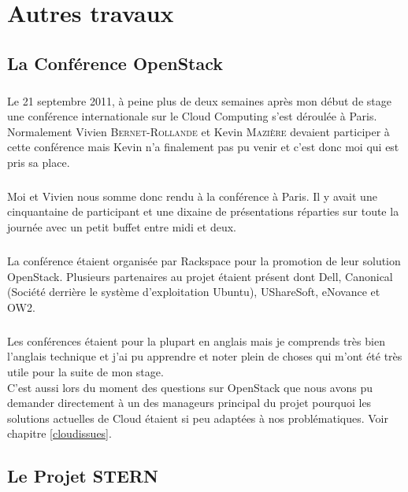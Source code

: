 \chapter{Autres travaux}

\section{La Conférence OpenStack}
\paragraph*{}
Le 21 septembre 2011, à peine plus de deux semaines après mon début de stage une conférence internationale sur le Cloud Computing s'est déroulée à Paris.
Normalement Vivien \textsc{Bernet-Rollande} et Kevin \textsc{Mazière} devaient participer à cette conférence mais Kevin n'a finalement pas pu venir et c'est donc
moi qui est pris sa place.

\paragraph*{}
Moi et Vivien nous somme donc rendu à la conférence à Paris.
Il y avait une cinquantaine de participant et une dixaine de présentations réparties sur toute la journée avec un petit buffet entre midi et deux.

\paragraph*{}
La conférence étaient organisée par Rackspace pour la promotion de leur solution OpenStack. Plusieurs partenaires au projet étaient présent dont Dell, Canonical (Société derrière
le système d'exploitation Ubuntu), UShareSoft, eNovance et OW2.

\paragraph*{}
Les conférences étaient pour la plupart en anglais mais je comprends très bien l'anglais technique et j'ai pu apprendre et noter plein de choses qui m'ont été très utile
pour la suite de mon stage.\\
C'est aussi lors du moment des questions sur OpenStack que nous avons pu demander directement à un des manageurs principal du projet pourquoi les solutions actuelles de Cloud
étaient si peu adaptées à nos problématiques. Voir chapitre \ref{cloudissues}.


\section{Le Projet STERN}
